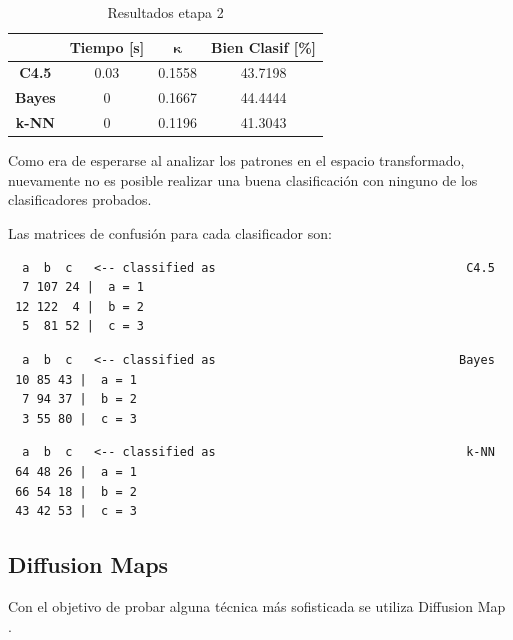 \documentclass[12pt,a4paper,titlepage]{report}
\newcommand{\bs}{\boldsymbol}
\begin{document}
\begin{table}[H]
\centering
	\begin{tabular}{c|c|c|c|} 
	\cline{2-4}
	& \multicolumn{1}{c|}{\cellcolor[gray]{0.7} \textbf{Tiempo [s]}}  
	& \multicolumn{1}{c|}{\cellcolor[gray]{0.7} $\bs\kappa$}
	& \multicolumn{1}{c|}{\cellcolor[gray]{0.7} \textbf{Bien Clasif [\%]}} \\ \hline
	
	\multicolumn{1}{|c|}{\cellcolor[gray]{0.8} \textbf{C4.5}}   & 0.03 & 0.1558 & \cellcolor[gray]{0.9} 43.7198  \\ \hline
	\multicolumn{1}{|c|}{\cellcolor[gray]{0.8} \textbf{Bayes}}  & 0 & 0.1667 & \cellcolor[gray]{0.9} 44.4444 \\ \hline
	\multicolumn{1}{|c|}{\cellcolor[gray]{0.8} \textbf{k-NN}}   & 0 & 0.1196 & \cellcolor[gray]{0.9} 41.3043 \\ \hline
	\end{tabular} 
	\caption{Resultados etapa 2}
	\label{tab:resultados_LDA}
\end{table}

Como era de esperarse al analizar los patrones en el espacio transformado, nuevamente no es posible realizar una buena clasificación con ninguno de los clasificadores probados.

Las matrices de confusión para cada clasificador son:
\vspace{-10pt}
\begin{lstlisting}
  a  b  c   <-- classified as									C4.5
  7 107 24 |  a = 1
 12 122  4 |  b = 2
  5  81 52 |  c = 3
\end{lstlisting}
\vspace{-1cm}
\begin{lstlisting}
  a  b  c   <-- classified as								   Bayes
 10 85 43 |  a = 1
  7 94 37 |  b = 2
  3 55 80 |  c = 3
\end{lstlisting}
\vspace{-1cm}
\begin{lstlisting}
  a  b  c   <-- classified as									k-NN
 64 48 26 |  a = 1
 66 54 18 |  b = 2
 43 42 53 |  c = 3
\end{lstlisting}


\subsection{Diffusion Maps}
Con el objetivo de probar alguna técnica más sofisticada se utiliza Diffusion Map \cite{bib:diffmaps}.\\
\end{document}
